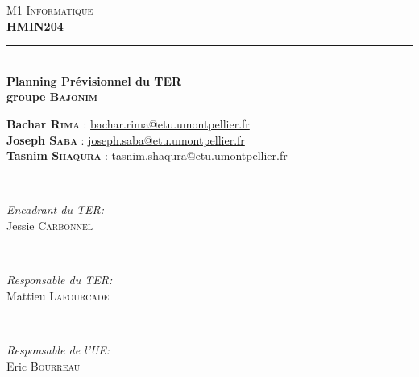 \documentclass[12pt,a4paper]{report}
\newcommand{\HRule}{\rule{\linewidth}{0.5mm}} %
\begin{document}
\centering

\textsc{\large M1 Informatique}\\[0.25cm]
\textsc{\large \textbf{HMIN204}}\\[0.25cm]

\HRule \\[0.4cm]
{ \large \bfseries Planning Prévisionnel du TER}\\[0.4cm]
{ \large \bfseries groupe \textsc{Bajonim}}\\[0.4cm]
\begin{minipage}{\textwidth}
\centering
\small
\textbf{Bachar \textsc{Rima}} : \href{mailto:bachar.rima@etu.umontpellier.fr}{bachar.rima@etu.umontpellier.fr}\\ %
\textbf{Joseph \textsc{Saba}} : \href{mailto:joseph.saba@etu.umontpellier.fr}{joseph.saba@etu.umontpellier.fr}\\ %
\textbf{Tasnim \textsc{Shaqura}} : \href{mailto:tasnim.shaqura@etu.umontpellier.fr}{tasnim.shaqura@etu.umontpellier.fr}\\ %
\end{minipage} \\[0.4cm]

\begin{minipage}[b]{0.4\textwidth}
\begin{flushleft} \small
\emph{Encadrant du TER:} \\
Jessie \textsc{Carbonnel} %
\end{flushleft}
\end{minipage}
~
\begin{minipage}[b]{0.4\textwidth}
\begin{flushright} \small
\emph{Responsable du TER:} \\
Mattieu \textsc{Lafourcade} %
\end{flushright}
\end{minipage}\\[0.4cm]

\begin{minipage}[b]{0.4\textwidth}
\begin{center} \small
\emph{Responsable de l'UE:} \\
Eric \textsc{Bourreau} %
\end{center}
\end{minipage}\\[0.4cm]
\end{document}
